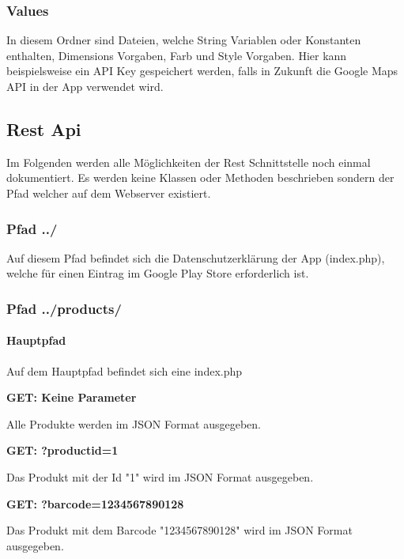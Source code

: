 \documentclass{scrartcl}
\begin{document}
\subsubsection{Values}

In diesem Ordner sind Dateien, welche String Variablen oder Konstanten enthalten, Dimensions Vorgaben, Farb und Style Vorgaben. Hier kann beispielsweise ein API Key gespeichert werden, falls in Zukunft die Google Maps API in der App verwendet wird.

\newpage

\subsection{Rest Api}
Im Folgenden werden alle Möglichkeiten der Rest Schnittstelle noch einmal dokumentiert. Es werden keine Klassen oder Methoden beschrieben sondern der Pfad welcher auf dem Webserver existiert.

\subsubsection{Pfad ../}

Auf diesem Pfad befindet sich die Datenschutzerklärung der App (index.php), welche für einen Eintrag im Google Play Store erforderlich ist.

\subsubsection{Pfad ../products/}

\paragraph{Hauptpfad}

Auf dem Hauptpfad befindet sich eine index.php \newline 

\noindent\textbf{GET: Keine Parameter}
 
\noindent Alle Produkte werden im JSON Format ausgegeben. \newline 

\noindent\textbf{GET: ?productid=1}

\noindent Das Produkt mit der Id "1" wird im JSON Format ausgegeben. \newline 

\noindent\textbf{GET: ?barcode=1234567890128}

\noindent Das Produkt mit dem Barcode "1234567890128" wird im JSON Format ausgegeben. \newline 
\end{document}
